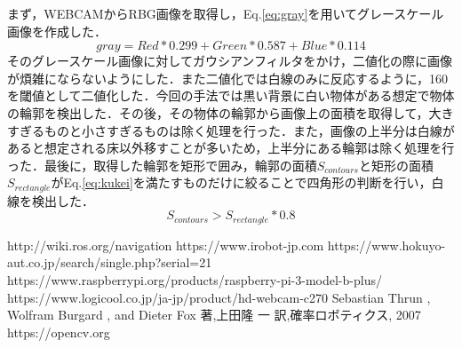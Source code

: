 \documentclass{jarticle}
\begin{document}
まず，WEBCAMからRBG画像を取得し，Eq.\ref{eq:gray}を用いてグレースケール画像を作成した．
\begin{equation}
	gray = Red * 0.299 +  Green * 0.587 + Blue * 0.114
	\label{eq:gray}
\end{equation}
そのグレースケール画像に対してガウシアンフィルタをかけ，二値化の際に画像が煩雑にならないようにした．また二値化では白線のみに反応するように，160を閾値として二値化した．今回の手法では黒い背景に白い物体がある想定で物体の輪郭を検出した．その後，その物体の輪郭から画像上の面積を取得して，大きすぎるものと小さすぎるものは除く処理を行った．また，画像の上半分は白線があると想定される床以外移すことが多いため，上半分にある輪郭は除く処理を行った．最後に，取得した輪郭を矩形で囲み，輪郭の面積$S_{contours}$と矩形の面積$S_{rectangle}$がEq.\ref{eq:kukei}を満たすものだけに絞ることで四角形の判断を行い，白線を検出した．
\begin{equation}
	S_{contours} > S_{rectangle} * 0.8
	\label{eq:kukei}
\end{equation}


\begin{thebibliography}{99}\scriptsize
	 http://wiki.ros.org/navigation
	 https://www.irobot-jp.com
	 https://www.hokuyo-aut.co.jp/search/single.php?serial=21
	 https://www.raspberrypi.org/products/raspberry-pi-3-model-b-plus/
	 https://www.logicool.co.jp/ja-jp/product/hd-webcam-c270
	 Sebastian Thrun , Wolfram Burgard , and Dieter Fox 著,上田隆	一 訳,確率ロボティクス, 2007
	 https://opencv.org
\end{thebibliography}
\end{document}
